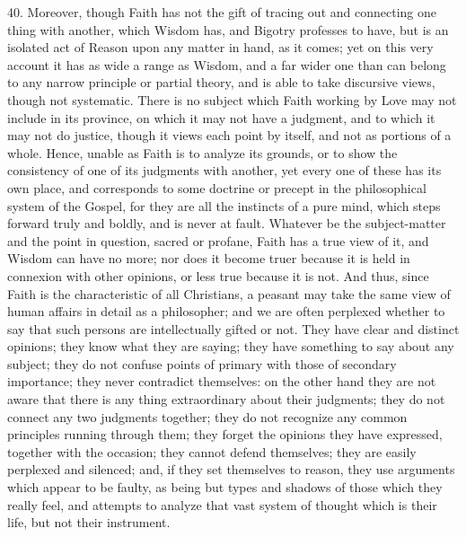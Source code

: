 40. Moreover, though Faith has not the gift of tracing out and
connecting one thing with another, which Wisdom has, and Bigotry
professes to have, but is an isolated act of Reason upon any matter in
hand, as it comes; yet on this very account it has as wide a range as
Wisdom, and a far wider one than can belong to any narrow principle or
partial theory, and is able to take discursive views, though not
systematic. There is no subject which Faith working by Love may not
include in its province, on which it may not have a judgment, and to
which it may not do justice, though it views each point by itself, and
not as portions of a whole. Hence, unable as Faith is to analyze its
grounds, or to show the consistency of one of its judgments with
another, yet every one of these has its own place, and corresponds to
some doctrine or precept in the philosophical system of the Gospel,
for they are all the instincts of a pure mind, which steps forward
truly and boldly, and is never at fault. Whatever be the
subject-matter and the point in question, sacred or profane, Faith has
a true view of it, and Wisdom can have no more; nor does it become
truer because it is held in connexion with other opinions, or less
true because it is not. And thus, since Faith is the characteristic of
all Christians, a peasant may take the same view of human affairs in
detail as a philosopher; and we are often perplexed whether to say
that such persons are intellectually gifted or not. They have clear
and distinct opinions; they know what they are saying; they have
something to say about any subject; they do not confuse points of
primary with those of secondary importance; they never contradict
themselves: on the other hand they are not aware that there is any
thing extraordinary about their judgments; they do not connect any two
judgments together; they do not recognize any common principles
running through them; they forget the opinions they have expressed,
together with the occasion; they cannot defend themselves; they are
easily perplexed and silenced; and, if they set themselves to reason,
they use arguments which appear to be faulty, as being but types and
shadows of those which they really feel, and attempts to analyze that
vast system of thought which is their life, but not their instrument.

